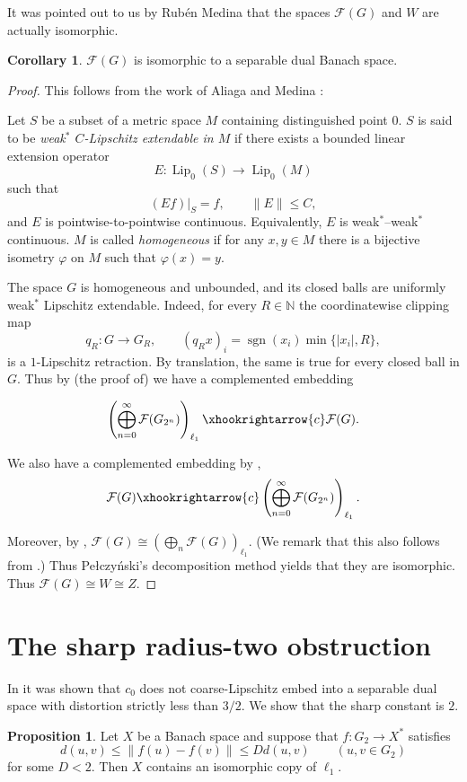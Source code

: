 \documentclass[11pt]{amsart}
\theoremstyle{definition}
\newtheorem{proposition}[theorem]{Proposition}
\newtheorem{corollary}[theorem]{Corollary}
\newcommand{\F}{\mathcal F}
\newcommand{\Lip}{\operatorname{Lip}}
\newcommand{\norm}[1]{\lVert#1\rVert}
\begin{document}
It was pointed out to us by Rub\'en Medina that the spaces $\mathcal F(G)$ and $W$ are actually isomorphic.

\begin{corollary}\label{cor:FG-separable-dual} $\F(G)$ is isomorphic to a separable dual Banach space. \end{corollary}

\begin{proof}
This follows from the work of Aliaga and Medina
\cite{AliagaMedina2026}:

Let $S$ be a
subset of a metric space $M$ containing distinguished point 0.  $S$ is said to be \emph{weak$^*$
$C$-Lipschitz extendable in $M$} if there exists a bounded linear
extension operator
\[
E:\Lip_0(S)\longrightarrow \Lip_0(M)
\]
such that
\[
(Ef)|_S=f,\qquad \|E\|\leq C,
\]
and $E$ is pointwise-to-pointwise continuous.  Equivalently, $E$ is weak$^*$--weak$^*$
continuous. $M$ is called {\em homogeneous} if for any $x, y\in M$ there is a bijective isometry $\varphi$ on $M$ such that $\varphi(x)=y$.

The space $G$ is homogeneous and unbounded,
and its closed balls are uniformly weak$^*$ Lipschitz extendable.
Indeed, for every $R\in\mathbb N$ the coordinatewise clipping map
$$
q_R:G\longrightarrow G_R,\qquad
(q_Rx)_i=\operatorname{sgn}(x_i)\min\{|x_i|,R\},
$$
is a $1$-Lipschitz retraction.  By translation, the same is true for
every closed ball in $G$.  Thus by (the proof of) \cite[Proposition 3.1]{AliagaMedina2026} we have a complemented embedding
 
$$
\left(
\bigoplus_{n=0}^{\infty}
\mathcal F(G_{2^n})
\right)_{\ell_1}
\xhookrightarrow{c}
\mathcal F(G).
$$

We also have a complemented embedding by \cite[Lemma 1.2 (Kalton)]{AliagaMedina2026},
$$
\mathcal F(G)
\xhookrightarrow{c}
\left(
\bigoplus_{n=0}^{\infty}
\mathcal F(G_{2^n})
\right)_{\ell_1}.
$$

Moreover, by \cite[Theorem~3.2]{AliagaMedina2026}, $\F(G)\cong \left(
\bigoplus_{n}
\mathcal F(G)
\right)_{\ell_1}.$ (We remark that this also follows from \cite[Theorem 8]{HN}.)
Thus Pe{\l}czy\'nski's decomposition method yields that they are isomorphic. Thus $\F(G)\cong W\cong Z$.
\end{proof}



\section{The sharp radius-two obstruction}\label{sec:lower}
In \cite{BLPP} it was shown that $c_0$ does not coarse-Lipschitz embed into a separable dual space with distortion strictly less than $3/2$. We show that the sharp constant is $2$. 
\begin{proposition}\label{prop:radius-two}
Let $X$ be a Banach space and suppose that $f:G_2\to X^*$ satisfies
\begin{equation}\label{eq:bilip-G2}
 d(u,v)\leq\norm{f(u)-f(v)}\leq Dd(u,v)
 \qquad(u,v\in G_2)
\end{equation}
for some $D<2$.  Then $X$ contains an isomorphic copy of $\ell_1$.
\end{proposition}
\end{document}
